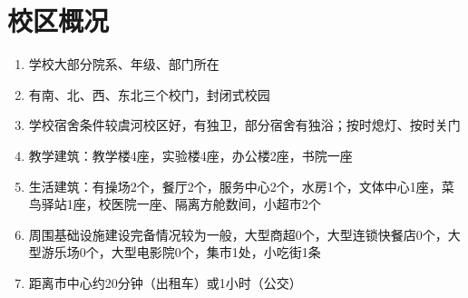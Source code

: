 
\section[校区概况]{校区概况}
\begin{enumerate}
    \item 学校大部分院系、年级、部门所在
    \item 有南、北、西、东北三个校门，封闭式校园\footnotemark
    \item 学校宿舍条件较虞河校区好，有独卫，部分宿舍有独浴；按时熄灯、按时关门
    \item 教学建筑：教学楼4座，实验楼4座，办公楼2座，书院一座
    \item 生活建筑：有操场2个，餐厅2个，服务中心2个，水房1个，文体中心1座，菜鸟驿站1座，校医院一座、隔离方舱数间，小超市2个
    \item 周围基础设施建设完备情况较为一般，大型商超0个，大型连锁快餐店0个，大型游乐场0个，大型电影院0个，集市1处，小吃街1条
    \item 距离市中心约20分钟（出租车）或1小时（公交）
\end{enumerate}

